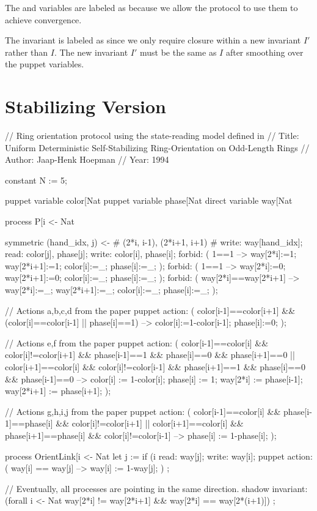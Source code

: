 The  and  variables are labeled as  because we allow the protocol to use them to achieve convergence.

The invariant is labeled as  since we only require closure within a new invariant $I'$ rather than $I$.
The new invariant $I'$ must be the same as $I$ after smoothing over the puppet variables.

\section{Stabilizing Version}
\begin{code}
// Ring orientation protocol using the state-reading model defined in
// Title: Uniform Deterministic Self-Stabilizing Ring-Orientation on Odd-Length Rings
// Author: Jaap-Henk Hoepman
// Year: 1994

constant N := 5;

puppet variable color[Nat %
puppet variable phase[Nat %
direct variable way[Nat %

process P[i <- Nat %
{
  symmetric (hand_idx, j)  <- {# (2*i, i-1), (2*i+1, i+1) #}
  {
    write: way[hand_idx];
    read: color[j], phase[j];
  }
  write: color[i], phase[i];
  forbid: ( 1==1 --> way[2*i]:=1; way[2*i+1]:=1; color[i]:=_; phase[i]:=_; );
  forbid: ( 1==1 --> way[2*i]:=0; way[2*i+1]:=0; color[i]:=_; phase[i]:=_; );
  forbid: ( way[2*i]==way[2*i+1] --> way[2*i]:=_; way[2*i+1]:=_; color[i]:=_; phase[i]:=_; );

  // Actions a,b,c,d from the paper
  puppet action:
    ( color[i-1]==color[i+1] && (color[i]==color[i-1] || phase[i]==1)
     -->
      color[i]:=1-color[i-1];
      phase[i]:=0;
    );

  // Actions e,f from the paper
  puppet action:
    (    color[i-1]==color[i] && color[i]!=color[i+1] && phase[i-1]==1 && phase[i]==0 && phase[i+1]==0
      || color[i+1]==color[i] && color[i]!=color[i-1] && phase[i+1]==1 && phase[i]==0 && phase[i-1]==0
     -->
      color[i] := 1-color[i];
      phase[i] := 1;
      way[2*i] := phase[i-1];
      way[2*i+1] := phase[i+1];
    );

  // Actions g,h,i,j from the paper
  puppet action:
    (    color[i-1]==color[i] && phase[i-1]==phase[i] && color[i]!=color[i+1]
      || color[i+1]==color[i] && phase[i+1]==phase[i] && color[i]!=color[i-1]
     -->
      phase[i] := 1-phase[i];
    );
}

process OrientLink[i <- Nat %
{
  let j := if (i %
  read: way[j];
  write: way[i];
  puppet action:
    ( way[i] == way[j] --> way[i] := 1-way[j]; )
    ;
}

// Eventually, all processes are pointing in the same direction.
shadow invariant:
  (forall i <- Nat %
   way[2*i] != way[2*i+1]
   &&
   way[2*i] == way[2*(i+1)])
  ;
\end{code}



